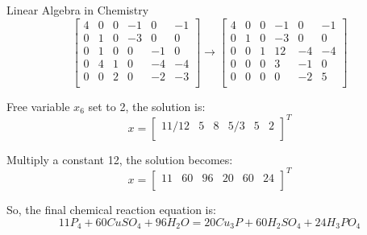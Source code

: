 \documentclass{beamer}
\begin{document}
\begin{frame}{Linear Algebra in Chemistry}
\begin{equation*}
    \left[ \begin{matrix}
        4&		0&		0&		-1&		0&		-1\\
        0&		1&		0&		-3&		0&		0\\
        0&		1&		0&		0&		-1&		0\\
        0&		4&		1&		0&		-4&		-4\\
        0&		0&		2&		0&		-2&		-3\\
    \end{matrix} \right] \rightarrow \left[ \begin{matrix}
        4&		0&		0&		-1&		0&		-1\\
        0&		1&		0&		-3&		0&		0\\
        0&		0&		1&		12&		-4&		-4\\
        0&		0&		0&		3&		-1&		0\\
        0&		0&		0&		0&		-2&		5\\
    \end{matrix} \right]
\end{equation*}

Free variable $x_6$ set to 2, the solution is:
\begin{equation*}
    x=\left[ \begin{matrix}
        11/12&		5&		8&		5/3&		5&		2\\
    \end{matrix} \right] ^T
\end{equation*}

Multiply a constant 12, the solution becomes:
\begin{equation*}
    x=\left[ \begin{matrix}
        11&		60&		96&		20&		60&		24\\
    \end{matrix} \right] ^T
\end{equation*}

So, the final chemical reaction equation is:
\begin{equation*}
    11P_4+60CuSO_4+96H_2O= 20Cu_3P+60H_2SO_4+24H_3PO_4
\end{equation*}
\end{frame}
\end{document}
